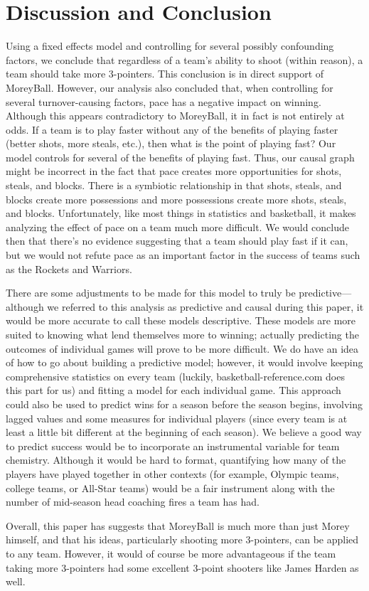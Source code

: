 \documentclass[12pt]{article}
\begin{document}
\section{Discussion and Conclusion}        	Using a fixed effects model and controlling for several possibly confounding factors, we conclude that regardless of a team's ability to shoot (within reason), a team should take more 3-pointers. This conclusion is in direct support of MoreyBall. However, our analysis also concluded that, when controlling for several turnover-causing factors, pace has a negative impact on winning. Although this appears contradictory to MoreyBall, it in fact is not entirely at odds. If a team is to play faster without any of the benefits of playing faster (better shots, more steals, etc.), then what is the point of playing fast? Our model controls for several of the benefits of playing fast. Thus, our causal graph might be incorrect in the fact that pace creates more opportunities for shots, steals, and blocks. There is a symbiotic relationship in that shots, steals, and blocks create more possessions and more possessions create more shots, steals, and blocks.  Unfortunately, like most things in statistics and basketball, it makes analyzing the effect of pace on a team much more difficult. We would conclude then that there's no evidence suggesting that a team should play fast if it can, but we would not refute pace as an important factor in the success of teams such as the Rockets and Warriors. \par
        	There are some adjustments to be made for this model to truly be predictive---although we referred to this analysis as predictive and causal during this paper, it would be more accurate to call these models descriptive. These models are more suited to knowing what lend themselves more to winning; actually predicting the outcomes of individual games will prove to be more difficult. We do have an idea of how to go about building a predictive model; however,  it would involve keeping comprehensive statistics
on every team (luckily, basketball-reference.com does this part for us) and fitting a model for each individual game. This approach could also be used to predict wins for a season before the season begins, involving lagged values and some measures for individual players (since every team is at least a little bit different at the beginning of each season). We believe a good way to predict success would be to
incorporate an instrumental variable for team chemistry. Although it would be hard to format, quantifying how many of the players have played together in other contexts (for example, Olympic teams, college teams, or All-Star teams) would be a fair instrument along with the number of mid-season head coaching fires a team has had.\par
        	Overall, this paper has suggests that MoreyBall is much more than just Morey
himself, and that his ideas, particularly shooting more 3-pointers, can be applied to any team. However, it would of course be more advantageous if the team taking more 3-pointers had some excellent 3-point shooters like James Harden as well.


\
\end{document}
